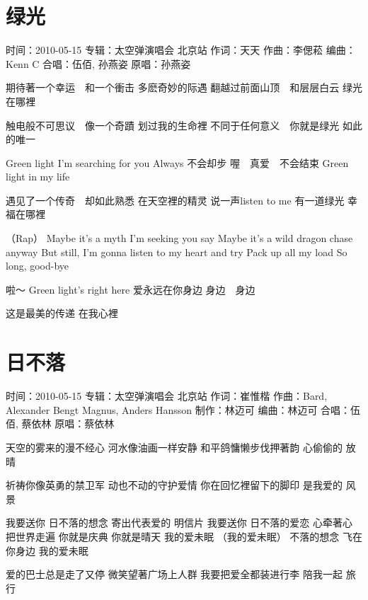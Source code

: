 \documentclass[UTF8,a4paper,oneside,twocolumn,12pt]{ctexbook}
\newcommand{\infopair}[2]{\textbullet #1：#2}
\newcommand{\zc}[1][伍佰]{\infopair{作词}{#1}}
\newcommand{\zq}[1][伍佰]{\infopair{作曲}{#1}}
\newcommand{\bq}[1][伍佰]{\infopair{编曲}{#1}}
\newcommand{\zj}[1]{\infopair{专辑}{#1}}
\newcommand{\zz}[1]{\infopair{制作}{#1}}
\newcommand{\yc}[1]{\infopair{原唱}{#1}}
\newcommand{\sj}[1]{\infopair{时间}{#1}}
\newenvironment{info}{\begin{flushleft}\kaishu
	}
	{\end{flushleft}\normalsize\yahei\par}
\newenvironment{lyric}{
	}
{}
\begin{document}
\section{绿光}
\begin{info}
	\sj{2010-05-15}
	\zj{太空弹演唱会 北京站}
	\zc[天天]
	\zq[李偲菘]
	\bq[Kenn C]
	\infopair{合唱}{伍佰, 孙燕姿}
	\yc{孙燕姿}
\end{info}
\begin{lyric}
	期待著一个幸运　和一个衝击
	多麽奇妙的际遇
	翻越过前面山顶　和层层白云
	绿光在哪裡

	触电般不可思议　像一个奇蹟
	划过我的生命裡
	不同于任何意义　你就是绿光
	如此的唯一

	Green light   I'm searching for you
	Always   不会却步
	喔　真爱　不会结束
	Green light in my life

	遇见了一个传奇　却如此熟悉
	在天空裡的精灵
	说一声listen to me 有一道绿光
	幸福在哪裡

	（Rap）
	Maybe it's a myth I'm seeking you say
	Maybe it's a wild dragon chase anyway
	But still, I'm gonna listen to my heart and try
	Pack up all my load
	So long, good-bye

	啦～
	Green light's right here
	爱永远在你身边
	身边　身边

	这是最美的传递
	在我心裡
\end{lyric}

\section{日不落}
\begin{info}
	\sj{2010-05-15}
	\zj{太空弹演唱会 北京站}
	\zc[崔惟楷]
	\zq[Bard, Alexander Bengt Magnus, Anders Hansson]
	\zz{林迈可}
	\bq[林迈可]
	\infopair{合唱}{伍佰, 蔡依林}
	\yc{蔡依林}
\end{info}
\begin{lyric}
	天空的雾来的漫不经心
	河水像油画一样安静
	和平鸽慵懒步伐押著韵
	心偷偷的 放晴

	祈祷你像英勇的禁卫军
	动也不动的守护爱情
	你在回忆裡留下的脚印
	是我爱的 风景

	我要送你 日不落的想念
	寄出代表爱的 明信片
	我要送你 日不落的爱恋
	心牵著心 把世界走遍
	你就是庆典 你就是晴天 我的爱未眠 （我的爱未眠）
	不落的想念 飞在你身边 我的爱未眠

	爱的巴士总是走了又停
	微笑望著广场上人群
	我要把爱全都装进行李
	陪我一起 旅行
\end{lyric}
\end{document}
